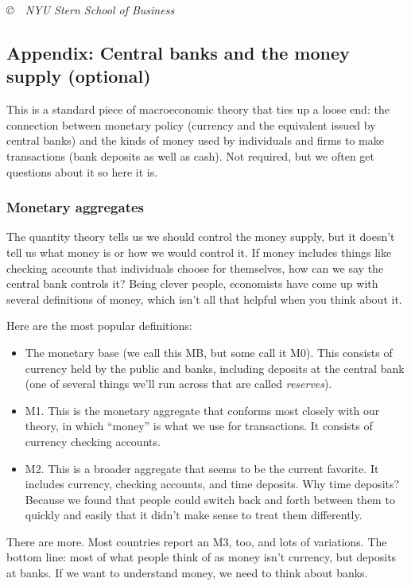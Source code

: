 \documentclass[letterpaper,12pt]{article}
\begin{document}
\vfill \centerline{\it \copyright \ \number\year \ NYU Stern
School of Business}

\pagebreak
\subsection*{Appendix: Central banks and the money supply (optional)}


This is a standard piece of macroeconomic theory that ties up a loose end:
the connection between monetary policy (currency and the equivalent
issued by central banks) and the kinds of money used by individuals
and firms to make transactions (bank deposits as well as cash).
Not required, but we often get questions about it so here it is.

\subsubsection*{Monetary aggregates}

The quantity theory tells us we should control the money supply,
but it doesn't tell us what money is or how we would control it.
If money includes things like checking accounts that individuals choose for themselves, how can we say the central bank controls it?
Being clever people, economists have come up with several definitions
of money,
which isn't all that helpful when you think about it.


Here are the most popular definitions:
\begin{itemize}

\item The monetary base (we call this MB, but some call it M0).
This consists of currency held by the public and banks,
including deposits at the central bank (one of several things
we'll run across that are called {\it reserves\/}).

\item M1.  This is the monetary
aggregate that conforms most closely with our
theory, in which ``money'' is what we use for transactions.
It consists of currency  checking accounts.

\item M2.  This is a broader aggregate that seems to be
the current favorite.
    It includes currency, checking accounts, and time deposits.
    Why time deposits?  Because we found that people could switch
    back and forth between them to quickly and easily that it didn't
    make sense to treat them differently.
\end{itemize}
%
There are more.  Most countries report an M3, too, and lots of variations.
The bottom line:  most of what people think of as money isn't currency,
but deposits at banks.
If we want to understand money, we need to think about banks.
\end{document}
